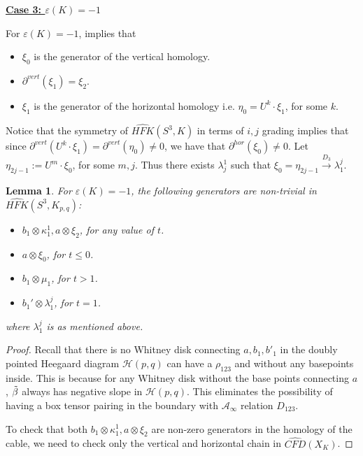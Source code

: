 \documentclass[11pt,reqno]{amsart}
\newtheorem {lemma}[theorem]{Lemma}
\theoremstyle{definition}
\newtheorem *{remark}{Remark}
\newcommand{\hfkhat}{\widehat{\mathit{HFK}}}
\newcommand{\cfdhat}{\widehat{\mathit{CFD}}}
\begin{document}
\begin{subsection}{\underline{\textbf{Case 3: $\varepsilon(K)=-1$}}} 
\label{case 3}


For $\varepsilon(K)=-1$, \cite[Section 4.2]{hom11} implies that 
\begin{itemize}
    \item $\xi_0$ is the generator of the vertical homology.
    \item $\partial^{vert}(\xi_1) = \xi_2$.
    \item $\xi_1$ is the generator of the horizontal homology i.e. $\eta_0 = U^{k} \cdot \xi_1$, for some $k$.
\end{itemize}

Notice that the symmetry of $\hfkhat(S^3,K)$ in terms of $i,j$ grading implies that since $\partial^{vert}(U^{k}\cdot \xi_1) = \partial^{vert}(\eta_0) \neq 0$, we have that $\partial^{hor}(\xi_0) \neq 0$. Let $\eta_{2j-1}:= U^{m} \cdot \xi_0 $, for some $m, j$. Thus there exists $\lambda^1_j$ such that $\xi_0= \eta_{2j-1} \xrightarrow{D_3} \lambda_1^j$.


\begin{lemma} \label{epsilon-1}
For $\varepsilon(K) = -1$, the following generators are non-trivial in $\hfkhat(S^3, K_{p,q})$:
\begin{itemize}
    \item $b_1 \otimes \kappa_1^1, a\otimes \xi_2$, for any value of $t$.
    \item $a \otimes \xi_0$, for $t \leq 0$.
    \item $b_1\otimes \mu_1$, for $t >1$.
    \item $b_1' \otimes \lambda^j_1$, for $t=1$.
\end{itemize}
where $\lambda^j_1$ is as mentioned above.
    
\end{lemma}

\begin{proof}
    Recall that there is no Whitney disk connecting $a, b_1, b'_1$ in the doubly pointed Heegaard diagram $\mathcal{H}(p,q)$ can have a $\rho_{123}$ and without any basepoints inside. This is because for any Whitney disk without the base points connecting $a$, $\Tilde{\beta}$ always has negative slope in $\mathcal{H}(p,q)$. This eliminates the possibility of having a box tensor pairing in the boundary with $\mathcal{A}_{\infty}$ relation $D_{123}$.

    To check that both $b_1 \otimes \kappa_1^1, a\otimes \xi_2$ are non-zero generators in the homology of the cable, we need to check only the vertical and horizontal chain in $\cfdhat(X_K)$. 
    

\end{proof}
\end{subsection}
\end{document}
